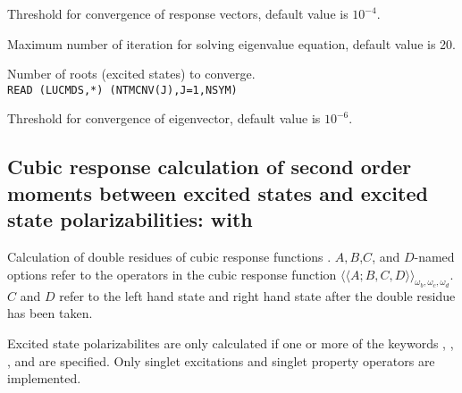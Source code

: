 \begin{description}
\item{}
Threshold for convergence of response vectors, default value is $10^{-4}$.

\item{}
Maximum number of iteration for solving eigenvalue equation, default
value is 20.

\item{}
Number of roots (excited states) to converge. \\
\verb|READ (LUCMDS,*) (NTMCNV(J),J=1,NSYM)|\\

\item{}
Threshold for convergence of eigenvector, default value is $10^{-6}$.

\end{description}


\subsection{Cubic response calculation of second order moments 
between excited states and excited state polarizabilities:
 with }
Calculation of double residues of
cubic response functions
\cite{pndjovhacpl242,djpnhajcp105,pndjhapdkrthhkcpl253}.
$A,B$,$C$, and $D$-named options refer to the operators in the cubic
response function 
$\langle\!\langle A;B,C,D \rangle\!\rangle_{\omega_b,\omega_c,\omega_d}$.
$C$ and $D$ refer to the left hand state and right hand state
after the double residue has been taken.

Excited state polarizabilites are only calculated if one or more of the keywords
, , , and 
are specified.
Only singlet excitations and singlet property operators are implemented.

